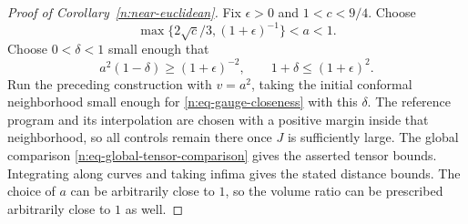 \begin{proof}[Proof of Corollary~\ref{n:near-euclidean}]
Fix \(\epsilon>0\) and \(1<c<9/4\). Choose
\[
 \max\{2\sqrt c/3,(1+\epsilon)^{-1}\}<a<1.
\]
Choose \(0<\delta<1\) small enough that
\[
 a^2(1-\delta)\geq(1+\epsilon)^{-2},
 \qquad 1+\delta\leq(1+\epsilon)^2.
\]
Run the preceding construction with \(v=a^2\), taking the initial
conformal neighborhood small enough for \eqref{n:eq-gauge-closeness}
with this \(\delta\). The reference program and its interpolation are
chosen with a positive margin inside that neighborhood, so all controls
remain there once \(J\) is sufficiently large. The global comparison
\eqref{n:eq-global-tensor-comparison} gives the asserted tensor bounds.
Integrating along curves and taking infima gives the stated distance
bounds. The choice of \(a\) can be arbitrarily close to \(1\), so the
volume ratio can be prescribed arbitrarily close to \(1\) as well.
\end{proof}
